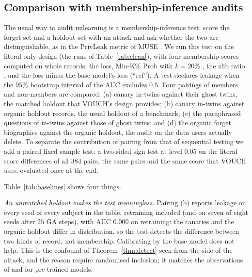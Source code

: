\subsection{Comparison with membership-inference audits}\label{sec:exp-baselines}

The usual way to audit unlearning is a membership-inference test: score the forget set and
a holdout set with an attack and ask whether the two are distinguishable, as in the
PrivLeak metric of MUSE \citep{shi2024muse}. We run this test on the literal-only design
(the runs of Table~\ref{tab:clean}), with four membership scores computed on whole records:
the loss, Min-K\% Prob with $k=20\%$ \citep{shi2024mink}, the zlib ratio
\citep{carlini2021extracting}, and the loss minus the base model's loss (``ref''). A test
declares leakage when the $95\%$ bootstrap interval of the AUC excludes $0.5$. Four
pairings of members and non-members are compared: (a) canary in-twins against their ghost
twins, the matched holdout that VOUCH's design provides; (b) canary in-twins against
organic holdout records, the usual holdout of a benchmark; (c) the paraphrased questions
of in-twins against those of ghost twins; and (d) the organic forget biographies against
the organic holdout, the audit on the data users actually delete. To separate the
contribution of pairing from that of sequential testing we add a paired fixed-sample test:
a two-sided sign test at level $0.05$ on the literal score differences of all $384$ pairs,
the same pairs and the same score that VOUCH uses, evaluated once at the end.

\begin{table}[t]
\centering\small
\caption{Fraction of seeds (VOUCH: of seeds $\times$ $40$ reveal orders) in which each audit
reports leakage, literal-only design, Pythia-410M, eight seeds. VOUCH columns are
REVOKED rates of the literal and the union rule; ``sign'' is the fraction of seeds in which
the paired fixed-sample sign test on the literal score rejects; membership-inference
columns are fractions of seeds whose $95\%$ bootstrap AUC interval excludes $0.5$. Retraining is the
exact null, so every positive entry in its row is a false alarm.}
\label{tab:baselines}
\setlength{\tabcolsep}{3.2pt}
\footnotesize\setlength{\tabcolsep}{3pt}
\end{table}

Table~\ref{tab:baselines} shows four things.

\emph{An unmatched holdout makes the test meaningless.} Pairing (b) reports leakage on
every seed of every subject in the table, retraining included (and on seven of eight
seeds after $25$ GA steps), with AUC $0.000$ on retraining: the
canaries and the organic holdout differ in distribution, so the test detects the
difference between two kinds of record, not membership. Calibrating by the base model does
not help. This is the confound of Theorem~\ref{thm:detect} seen from the side of the
attack, and the reason \citet{zhang2024mia} require randomised inclusion; it matches the
observations of \citet{duan2024membership} and \citet{das2024blind} for pre-trained
models.

